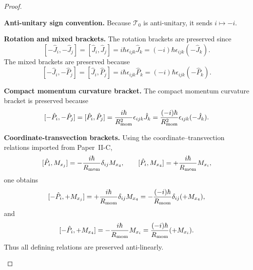 \documentclass[12pt,a4paper]{article}
\begin{document}
\begin{proof}

\begin{proofsteps}
\item \textbf{Anti-unitary sign convention.}
Because \(\mathcal T_0\) is anti-unitary, it sends \(i\mapsto -i\).

\item \textbf{Rotation and mixed brackets.}
The rotation brackets are preserved since
\[
[-\hat J_i,-\hat J_j]=[\hat J_i,\hat J_j]
=i\hbar\epsilon_{ijk}\hat J_k
=(-i)\hbar\epsilon_{ijk}(-\hat J_k).
\]
The mixed brackets are preserved because
\[
[-\hat J_i,-\hat P_j]=[\hat J_i,\hat P_j]
=i\hbar\epsilon_{ijk}\hat P_k
=(-i)\hbar\epsilon_{ijk}(-\hat P_k).
\]

\item \textbf{Compact momentum curvature bracket.}
The compact momentum curvature bracket is preserved because
\[
[-\hat P_i,-\hat P_j]=[\hat P_i,\hat P_j]
=\frac{i\hbar}{R_{\mathrm{mom}}^2}\epsilon_{ijk}\hat J_k
=\frac{(-i)\hbar}{R_{\mathrm{mom}}^2}\epsilon_{ijk}(-\hat J_k).
\]

\item \textbf{Coordinate-transvection brackets.}
Using the coordinate--transvection relations imported from Paper~II-C,
\[
[\hat P_i,M_{x_j}]=-\frac{i\hbar}{R_{\mathrm{mom}}}\delta_{ij}M_{x_4},
\qquad
[\hat P_i,M_{x_4}]=+\frac{i\hbar}{R_{\mathrm{mom}}}M_{x_i},
\]
one obtains
\[
[-\hat P_i,+M_{x_j}]
=+\frac{i\hbar}{R_{\mathrm{mom}}}\delta_{ij}M_{x_4}
=-\frac{(-i)\hbar}{R_{\mathrm{mom}}}\delta_{ij}(+M_{x_4}),
\]
and
\[
[-\hat P_i,+M_{x_4}]
=-\frac{i\hbar}{R_{\mathrm{mom}}}M_{x_i}
=\frac{(-i)\hbar}{R_{\mathrm{mom}}}(+M_{x_i}).
\]
Thus all defining relations are preserved anti-linearly.


\end{proofsteps}
\end{proof}
\end{document}
